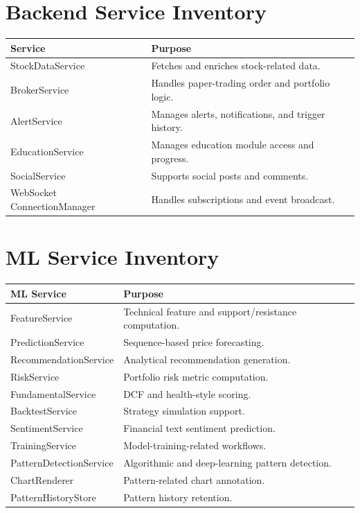 \documentclass[12pt,a4paper]{report}
\begin{document}
\section{Backend Service Inventory}
\begin{longtable}{p{} p{}}
\textbf{Service} & \textbf{Purpose} \\
\hline
StockDataService & Fetches and enriches stock-related data. \\
BrokerService & Handles paper-trading order and portfolio logic. \\
AlertService & Manages alerts, notifications, and trigger history. \\
EducationService & Manages education module access and progress. \\
SocialService & Supports social posts and comments. \\
WebSocket ConnectionManager & Handles subscriptions and event broadcast. \\
\end{longtable}

\section{ML Service Inventory}
\begin{longtable}{p{} p{}}
\textbf{ML Service} & \textbf{Purpose} \\
\hline
FeatureService & Technical feature and support/resistance computation. \\
PredictionService & Sequence-based price forecasting. \\
RecommendationService & Analytical recommendation generation. \\
RiskService & Portfolio risk metric computation. \\
FundamentalService & DCF and health-style scoring. \\
BacktestService & Strategy simulation support. \\
SentimentService & Financial text sentiment prediction. \\
TrainingService & Model-training-related workflows. \\
PatternDetectionService & Algorithmic and deep-learning pattern detection. \\
ChartRenderer & Pattern-related chart annotation. \\
PatternHistoryStore & Pattern history retention. \\
\end{longtable}
\end{document}
